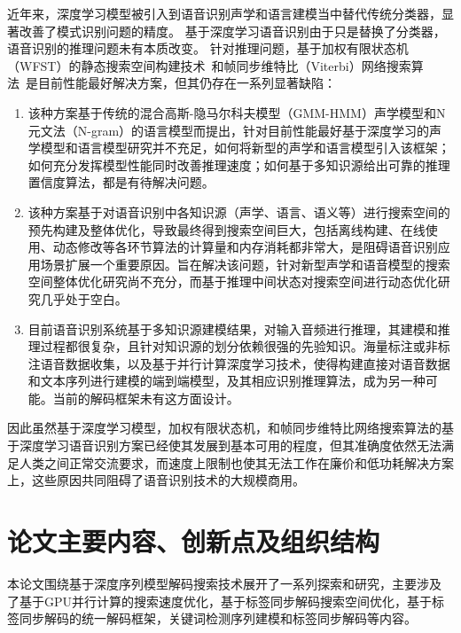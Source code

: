 近年来，深度学习模型被引入到语音识别声学和语言建模当中替代传统分类器，显著改善了模式识别问题的精度。 基于深度学习语音识别由于只是替换了分类器，语音识别的推理问题未有本质改变。
针对推理问题，基于加权有限状态机（WFST）的静态搜索空间构建技术~\cite{mohri2002weighted}和帧同步维特比（Viterbi）网络搜索算法~\cite{forney1973viterbi}是目前性能最好解决方案，但其仍存在一系列显著缺陷：
\begin{enumerate}
\item 该种方案基于传统的混合高斯-隐马尔科夫模型（GMM-HMM）声学模型和N元文法（N-gram）的语言模型而提出，针对目前性能最好基于深度学习的声学模型和语言模型研究并不充足，如何将新型的声学和语言模型引入该框架；如何充分发挥模型性能同时改善推理速度；如何基于多知识源给出可靠的推理置信度算法，都是有待解决问题。
\item 该种方案基于对语音识别中各知识源（声学、语言、语义等）进行搜索空间的预先构建及整体优化，导致最终得到搜索空间巨大，包括离线构建、在线使用、动态修改等各环节算法的计算量和内存消耗都非常大，是阻碍语音识别应用场景扩展一个重要原因。旨在解决该问题，针对新型声学和语音模型的搜索空间整体优化研究尚不充分，而基于推理中间状态对搜索空间进行动态优化研究几乎处于空白。
\item 目前语音识别系统基于多知识源建模结果，对输入音频进行推理，其建模和推理过程都很复杂，且针对知识源的划分依赖很强的先验知识。海量标注或非标注语音数据收集，以及基于并行计算深度学习技术，使得构建直接对语音数据和文本序列进行建模的端到端模型，及其相应识别推理算法，成为另一种可能。当前的解码框架未有这方面设计。
\end{enumerate}

因此虽然基于深度学习模型，加权有限状态机，和帧同步维特比网络搜索算法的基于深度学习语音识别方案已经使其发展到基本可用的程度，但其准确度依然无法满足人类之间正常交流要求，而速度上限制也使其无法工作在廉价和低功耗解决方案上，这些原因共同阻碍了语音识别技术的大规模商用。


\section{论文主要内容、创新点及组织结构}
\label{chap:intro0-thesis}
本论文围绕基于深度序列模型解码搜索技术展开了一系列探索和研究，主要涉及
了基于GPU并行计算的搜索速度优化，基于标签同步解码搜索空间优化，基于标签同步解码的统一解码框架，关键词检测序列建模和标签同步解码等内容。

